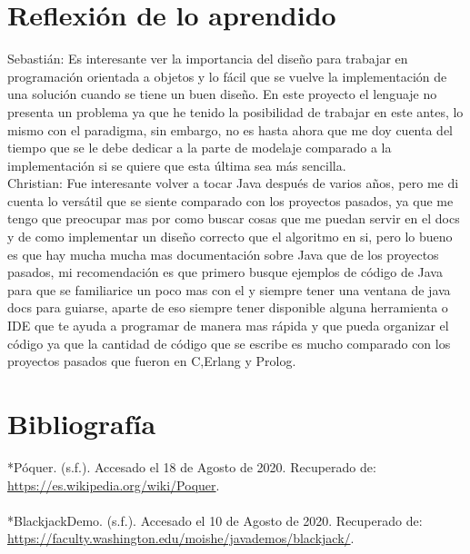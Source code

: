 \documentclass{article}
\begin{document}
\section{Reflexión de lo aprendido}

Sebastián: Es interesante ver la importancia del diseño para trabajar en programación orientada a objetos y lo fácil que se vuelve la implementación de una solución cuando se tiene un buen diseño. En este proyecto el lenguaje no presenta un problema ya que he tenido la posibilidad de trabajar en este antes, lo mismo con el paradigma, sin embargo, no es hasta ahora que me doy cuenta del tiempo que se le debe dedicar a la parte de modelaje comparado a la implementación si se quiere que esta última sea más sencilla.
\vspace{0.5cm}\\
Christian: Fue interesante volver a tocar Java después de varios años, pero me di cuenta lo versátil que se siente comparado con los proyectos pasados, ya que me tengo que preocupar mas por como buscar cosas que me puedan servir en el docs y de como implementar un diseño correcto que el algoritmo en si, pero lo bueno es que hay mucha mucha mas documentación sobre Java que de los proyectos pasados, mi recomendación es que primero busque ejemplos de código de Java para que se familiarice un poco mas con el y siempre tener una ventana de java docs para guiarse, aparte de eso siempre tener disponible alguna herramienta o IDE que te ayuda a programar de manera mas rápida y que pueda organizar el código ya que la cantidad de código que se escribe es mucho comparado con los proyectos pasados que fueron en C,Erlang y Prolog.
\newpage
\section{Bibliografía}

*Póquer. (s.f.). Accesado el 18 de Agosto de 2020. Recuperado de:
\url{https://es.wikipedia.org/wiki/Poquer}.
\\
\\
*BlackjackDemo. (s.f.). Accesado el 10 de Agosto de 2020. Recuperado de:
\url{https://faculty.washington.edu/moishe/javademos/blackjack/}.
\end{document}
